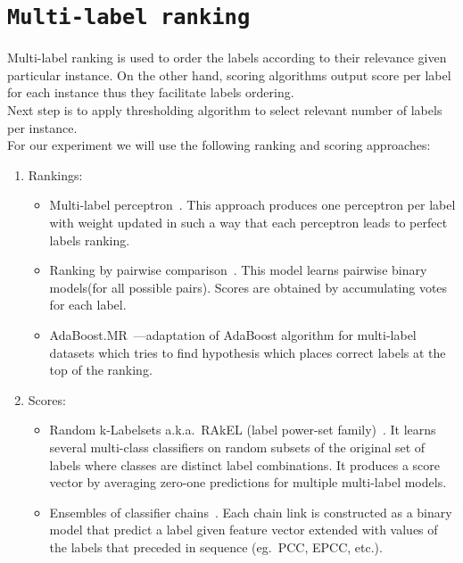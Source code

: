 \documentclass[12pt,a4paper,twocolumn]{article}
\begin{document}
\section*{\texttt{Multi-label ranking}}
Multi-label ranking is used to order the labels according to their relevance given particular instance. On the other hand, scoring algorithms output score per label for each instance thus they facilitate labels ordering.\\
Next step is to apply thresholding algorithm to select relevant number of labels per instance.\\
For our experiment we will use the following ranking and scoring approaches:

\begin{enumerate}
\item Rankings:
	\begin{itemize}
	\item Multi-label perceptron~\cite{Crammer03afamily}. This approach produces one perceptron per label with weight updated in such a way that each perceptron leads to perfect labels ranking. %
	\item Ranking by pairwise comparison~\cite{Wu:2004:PEM:1005332.1016791}. This model learns pairwise binary models(for all possible pairs). Scores are obtained by accumulating votes for each label. %
	\item AdaBoost.MR~\cite{Schapire00boostexter:a}---adaptation of AdaBoost algorithm for multi-label datasets which tries to find hypothesis which places correct labels at the top of the ranking. %
	\end{itemize}
\item Scores:
	\begin{itemize}
	\item Random k-Labelsets a.k.a.\ RAkEL (label power-set family)~\cite{Tsoumakas:2007:RKE:1421665.1421705}. It learns several multi-class classifiers on random subsets of the original set of labels where classes are distinct label combinations. It produces a score vector by averaging zero-one predictions for multiple multi-label models. %
	\item Ensembles of classifier chains~\cite{Read:2009:CCM:1617459.1617477}. Each chain link is constructed as a binary model that predict a label given feature vector extended with values of the labels that preceded in sequence (eg.\ PCC, EPCC, etc.). %
	\end{itemize}
\end{enumerate}
\end{document}
